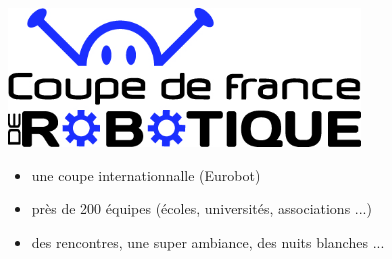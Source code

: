 \begin{frame}
   \begin{center}
      \includegraphics[width=0.7\textwidth]{../images/cdf.jpg}
   \end{center}
   \begin{itemize}
      \item une coupe internationnalle (Eurobot)
      \item près de 200 équipes (écoles, universités, associations ...)
      \item des rencontres, une super ambiance, des nuits blanches ...
   \end{itemize}
\end{frame}

\begin{frame}
   \begin{center}
   \end{center}
\end{frame}
